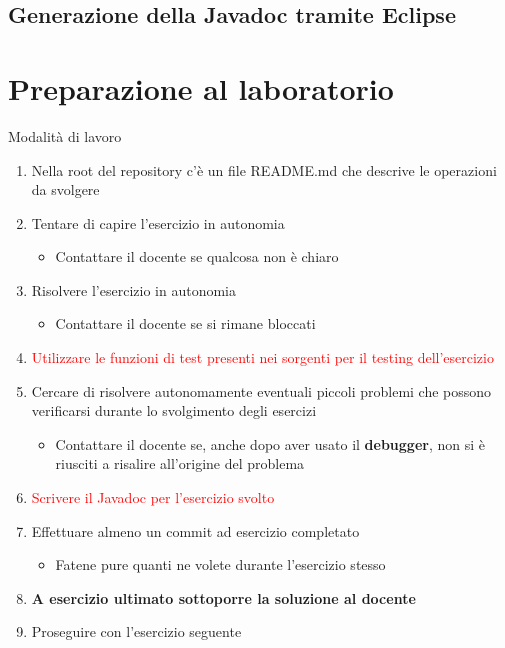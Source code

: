 \documentclass[presentation]{beamer}
\begin{document}
\subsection{Generazione della Javadoc tramite Eclipse}




\section{Preparazione al laboratorio}

\begin{frame}{Modalità di lavoro}
	\begin{enumerate}
		\item Nella root del repository c'è un file README.md che descrive le operazioni da svolgere
		\item Tentare di capire l'esercizio in autonomia
		\begin{itemize}
			\item Contattare il docente se qualcosa non è chiaro
		\end{itemize}
		\item Risolvere l'esercizio in autonomia
		\begin{itemize}
			\item Contattare il docente se si rimane bloccati
		\end{itemize}
		\item \textcolor{red}{Utilizzare le funzioni di test presenti nei sorgenti per il testing dell'esercizio}
		\item Cercare di risolvere autonomamente eventuali piccoli problemi che possono verificarsi durante lo svolgimento degli esercizi
		\begin{itemize}
			\item Contattare il docente se, anche dopo aver usato il \textbf{debugger}, non si è riusciti a risalire all'origine del problema
		\end{itemize}
		\item \textcolor{red}{Scrivere il Javadoc per l'esercizio svolto}
		\item Effettuare almeno un commit ad esercizio completato
		\begin{itemize}
			\item Fatene pure quanti ne volete durante l'esercizio stesso
		\end{itemize}
		\item \textbf{A esercizio ultimato sottoporre la soluzione al docente}
		\item Proseguire con l'esercizio seguente
	\end{enumerate}
\end{frame}
\end{document}
